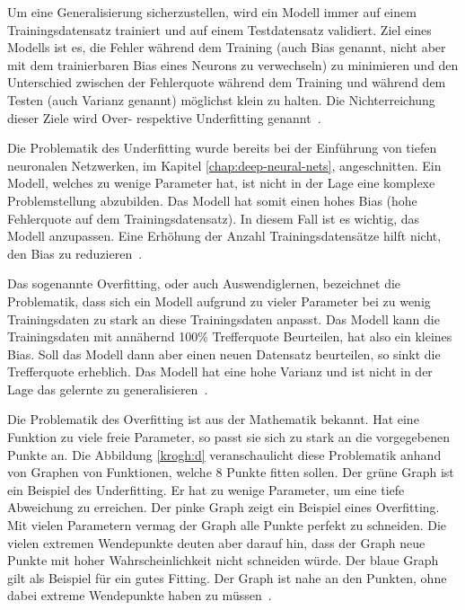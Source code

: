 Um eine Generalisierung sicherzustellen, wird ein Modell immer auf einem Trainingsdatensatz trainiert und auf einem Testdatensatz validiert. Ziel eines Modells ist es, die Fehler während dem Training (auch Bias genannt, nicht aber mit dem trainierbaren Bias eines Neurons zu verwechseln) zu minimieren und den Unterschied zwischen der Fehlerquote während dem Training und während dem Testen (auch Varianz genannt) möglichst klein zu halten. Die Nichterreichung dieser Ziele wird Over- respektive Underfitting genannt~\autocite{Goodfellow2016}.

Die Problematik des Underfitting wurde bereits bei der Einführung von tiefen neuronalen Netzwerken, im Kapitel \ref{chap:deep-neural-nets}, angeschnitten. Ein Modell, welches zu wenige Parameter hat, ist nicht in der Lage eine komplexe Problemstellung abzubilden. Das Modell hat somit einen hohes Bias (hohe Fehlerquote auf dem Trainingsdatensatz). In diesem Fall ist es wichtig, das Modell anzupassen. Eine Erhöhung der Anzahl Trainingsdatensätze hilft nicht, den Bias zu reduzieren~\autocite{MLYearning}.

Das sogenannte Overfitting, oder auch Auswendiglernen, bezeichnet die Problematik, dass sich ein Modell aufgrund zu vieler Parameter bei zu wenig Trainingsdaten zu stark an diese Trainingsdaten anpasst. Das Modell kann die Trainingsdaten mit annähernd 100\% Trefferquote Beurteilen, hat also ein kleines Bias. Soll das Modell dann aber einen neuen Datensatz beurteilen, so sinkt die Trefferquote erheblich. Das Modell hat eine hohe Varianz und ist nicht in der Lage das gelernte zu generalisieren~\autocite{MLYearning, Krogh2008}.

Die Problematik des Overfitting ist aus der Mathematik bekannt. Hat eine Funktion zu viele freie Parameter, so passt sie sich zu stark an die vorgegebenen Punkte an. Die Abbildung \ref{krogh:d} veranschaulicht diese Problematik anhand von Graphen von Funktionen, welche 8 Punkte fitten sollen. Der grüne Graph ist ein Beispiel des Underfitting. Er hat zu wenige Parameter, um eine tiefe Abweichung zu erreichen. Der pinke Graph zeigt ein Beispiel eines Overfitting. Mit vielen Parametern vermag der Graph alle Punkte perfekt zu schneiden. Die vielen extremen Wendepunkte deuten aber darauf hin, dass der Graph neue Punkte mit hoher Wahrscheinlichkeit nicht schneiden würde. Der blaue Graph gilt als Beispiel für ein gutes Fitting. Der Graph ist nahe an den Punkten, ohne dabei extreme Wendepunkte haben zu müssen~\autocite{Krogh2008}.


